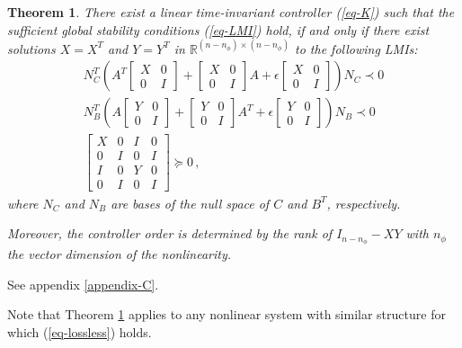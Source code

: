\documentclass[12pt, a4paper,reqno]{amsart}
\newtheorem{theorem}{\bf Theorem}
\renewenvironment{proof}{\noindent {\bf Proof: }}{\rm\\}
\theoremstyle{definition}
\begin{document}
\begin{theorem}\label{theoLMI}
There exist a linear time-invariant controller {\rm (\ref{eq-K})}  such that the sufficient global stability conditions {\rm (\ref{eq-LMI})} hold, if and only if there exist solutions $X=X^T$ and $Y=Y^T$ in $\mathbb R^{(n-n_\phi)\times (n-n_\phi)}$ to the 
following LMIs:
\begin{equation}\begin{split}\label{eq-LMIXY}
    N_C^T\left( A^T \begin{bmatrix}X & 0 \\0 & I \end{bmatrix}+  \begin{bmatrix}X & 0 \\0 & I \end{bmatrix} A + \epsilon \begin{bmatrix}X & 0 \\0 & I \end{bmatrix} \right)N_C \prec 0 \\
    N_B^T\left( A \begin{bmatrix}Y & 0 \\0 & I \end{bmatrix}+  \begin{bmatrix}Y & 0 \\0 & I \end{bmatrix} A^T + \epsilon \begin{bmatrix}Y & 0 \\0 & I \end{bmatrix} \right)N_B \prec 0 \\
    \begin{bmatrix}X & 0 &I & 0 \\0 & I & 0 & I \\I & 0 & Y&0 \\0 & I &0 & I \end{bmatrix} \succeq 0 \,,
\end{split}\end{equation}
where $N_C$ and $N_B$ are bases of the null space of $C$ and $B^T$, respectively.

Moreover, the controller order is determined by the rank of 
$I_{n-n_\phi} - XY$
with $n_\phi$ the vector dimension of the nonlinearity. 
\end{theorem}
\begin{proof}
 See appendix \ref{appendix-C}.    
\end{proof}

Note that Theorem \ref{theoLMI} applies to any nonlinear system with similar structure for which (\ref{eq-lossless}) holds.  
\end{document}
